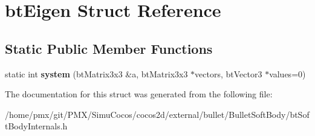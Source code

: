 \hypertarget{structbtEigen}{}\section{bt\+Eigen Struct Reference}
\label{structbtEigen}
\subsection*{Static Public Member Functions}
\begin{DoxyCompactItemize}
\item 
\mbox{\label{structbtEigen_a494fdac32036151ec4cd7962ba74d068}} 
static int {\bfseries system} (bt\+Matrix3x3 \&a, bt\+Matrix3x3 $\ast$vectors, bt\+Vector3 $\ast$values=0)
\end{DoxyCompactItemize}


The documentation for this struct was generated from the following file\+:\begin{DoxyCompactItemize}
\item 
/home/pmx/git/\+P\+M\+X/\+Simu\+Cocos/cocos2d/external/bullet/\+Bullet\+Soft\+Body/bt\+Soft\+Body\+Internals.\+h\end{DoxyCompactItemize}
